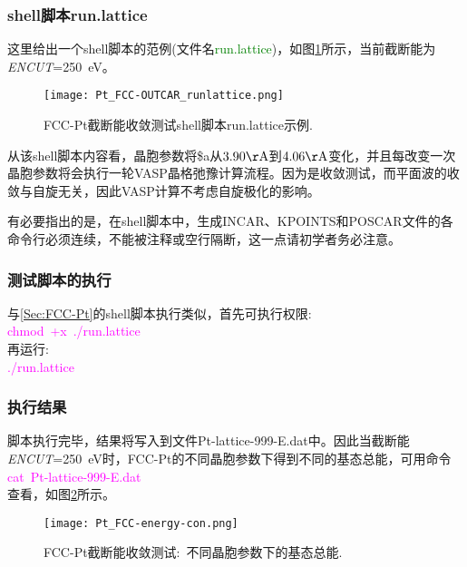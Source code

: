\subsubsection{\rm{shell}脚本\rm{run.lattice}}
这里给出一个\textrm{shell}脚本的范例(文件名\textcolor{green}{\textrm{run.lattice}})，如图\ref{Pt_FCC-runlattice}所示，当前截断能为\textit{ENCUT}=250\textrm{~eV}。
\begin{figure}[h!]
\centering
\hspace*{-20pt}
\texttt{[image: Pt\_FCC-OUTCAR\_runlattice.png]}
\caption{\small \textrm{FCC-Pt}截断能收敛测试\textrm{shell}脚本\textrm{run.lattice}示例.}%
\label{Pt_FCC-runlattice}
\end{figure}

从该\textrm{shell}脚本内容看，晶胞参数将\textrm{\$a}从$3.90\mathrm{\AA}$到$4.06\mathrm{\AA}$变化，并且每改变一次晶胞参数将会执行一轮\textrm{VASP}晶格弛豫计算流程。因为是收敛测试，而平面波的收敛与自旋无关，因此\textrm{VASP}计算不考虑自旋极化的影响。

有必要指出的是，在\textrm{shell}脚本中，生成\textrm{INCAR}、\textrm{KPOINTS}和\textrm{POSCAR}文件的各命令行必须连续，不能被注释或空行隔断，这一点请初学者务必注意。
\subsubsection{\rm{测试脚本的执行}}
与\ref{Sec:FCC-Pt}的\textrm{shell}脚本执行类似，首先可执行权限:\\
\textcolor{magenta}{\textrm{
chmod~+x~./run.lattice}}\\%
再运行:\\
\textcolor{magenta}{\textrm{./run.lattice }}
\subsubsection{\rm{执行结果}}
脚本执行完毕，结果将写入到文件\textrm{Pt-lattice-999-E.dat}中。因此当截断能\textit{ENCUT}=250\textrm{~eV}时，\textrm{FCC-Pt}的不同晶胞参数下得到不同的基态总能，可用命令\\
\textcolor{magenta}{\textrm{cat~Pt-lattice-999-E.dat}}\\
查看，如图\ref{Pt_FCC-energy-con}所示。
\begin{figure}[h!]
\centering
\vskip -8pt
\texttt{[image: Pt\_FCC-energy-con.png]}
\caption{\small \textrm{FCC-Pt}截断能收敛测试:~不同晶胞参数下的基态总能.}%
\label{Pt_FCC-energy-con}
\end{figure}

